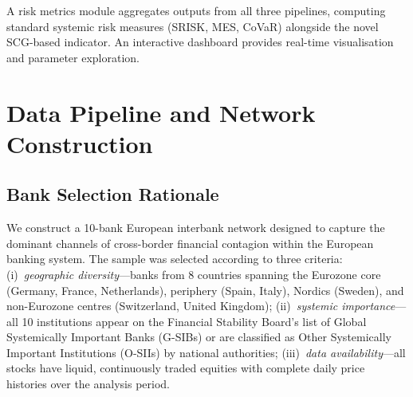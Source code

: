 A risk metrics module aggregates outputs from all three pipelines, computing standard systemic risk measures (SRISK, MES, CoVaR) alongside the novel SCG-based indicator. An interactive dashboard provides real-time visualisation and parameter exploration.


\section{Data Pipeline and Network Construction}
\label{sec:data-pipeline}

\subsection{Bank Selection Rationale}

We construct a 10-bank European interbank network designed to capture the dominant channels of cross-border financial contagion within the European banking system. The sample was selected according to three criteria: (i)~\emph{geographic diversity}---banks from 8 countries spanning the Eurozone core (Germany, France, Netherlands), periphery (Spain, Italy), Nordics (Sweden), and non-Eurozone centres (Switzerland, United Kingdom); (ii)~\emph{systemic importance}---all 10 institutions appear on the Financial Stability Board's list of Global Systemically Important Banks (G-SIBs) or are classified as Other Systemically Important Institutions (O-SIIs) by national authorities; (iii)~\emph{data availability}---all stocks have liquid, continuously traded equities with complete daily price histories over the analysis period.

